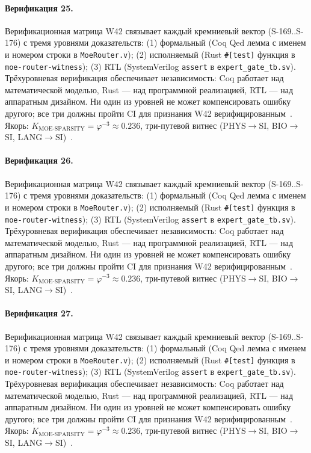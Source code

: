 \paragraph{Верификация 25.} Верификационная матрица W42 связывает каждый кремниевый вектор (S-169..S-176) с тремя уровнями доказательств: (1) формальный (Coq Qed лемма с именем и номером строки в \texttt{MoeRouter.v}); (2) исполняемый (Rust \texttt{\#[test]} функция в \texttt{moe-router-witness}); (3) RTL (SystemVerilog \texttt{assert} в \texttt{expert\_gate\_tb.sv}). Трёхуровневая верификация обеспечивает независимость: Coq работает над математической моделью, Rust --- над программной реализацией, RTL --- над аппаратным дизайном. Ни один из уровней не может компенсировать ошибку другого; все три должны пройти CI для признания W42 верифицированным~\cite{lee_gvsu_proof2021}. Якорь: $K_{\text{MOE-SPARSITY}} = \varphi^{-3} \approx 0{.}236$, три-путевой витнес (PHYS$\to$SI, BIO$\to$SI, LANG$\to$SI)~\cite{zenodo_trinity_2026}.

\paragraph{Верификация 26.} Верификационная матрица W42 связывает каждый кремниевый вектор (S-169..S-176) с тремя уровнями доказательств: (1) формальный (Coq Qed лемма с именем и номером строки в \texttt{MoeRouter.v}); (2) исполняемый (Rust \texttt{\#[test]} функция в \texttt{moe-router-witness}); (3) RTL (SystemVerilog \texttt{assert} в \texttt{expert\_gate\_tb.sv}). Трёхуровневая верификация обеспечивает независимость: Coq работает над математической моделью, Rust --- над программной реализацией, RTL --- над аппаратным дизайном. Ни один из уровней не может компенсировать ошибку другого; все три должны пройти CI для признания W42 верифицированным~\cite{lee_gvsu_proof2021}. Якорь: $K_{\text{MOE-SPARSITY}} = \varphi^{-3} \approx 0{.}236$, три-путевой витнес (PHYS$\to$SI, BIO$\to$SI, LANG$\to$SI)~\cite{zenodo_trinity_2026}.

\paragraph{Верификация 27.} Верификационная матрица W42 связывает каждый кремниевый вектор (S-169..S-176) с тремя уровнями доказательств: (1) формальный (Coq Qed лемма с именем и номером строки в \texttt{MoeRouter.v}); (2) исполняемый (Rust \texttt{\#[test]} функция в \texttt{moe-router-witness}); (3) RTL (SystemVerilog \texttt{assert} в \texttt{expert\_gate\_tb.sv}). Трёхуровневая верификация обеспечивает независимость: Coq работает над математической моделью, Rust --- над программной реализацией, RTL --- над аппаратным дизайном. Ни один из уровней не может компенсировать ошибку другого; все три должны пройти CI для признания W42 верифицированным~\cite{lee_gvsu_proof2021}. Якорь: $K_{\text{MOE-SPARSITY}} = \varphi^{-3} \approx 0{.}236$, три-путевой витнес (PHYS$\to$SI, BIO$\to$SI, LANG$\to$SI)~\cite{zenodo_trinity_2026}.

